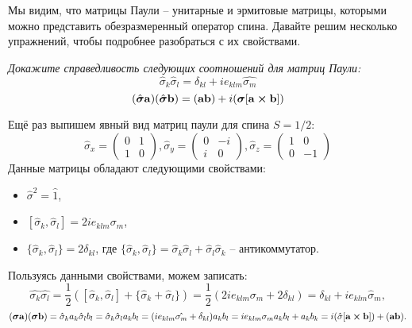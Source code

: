 Мы видим, что матрицы Паули -- унитарные и эрмитовые матрицы, которыми можно представить обезразмеренный оператор спина. Давайте решим несколько упражнений, чтобы подробнее разобраться с их свойствами.
\begin{center}
    \textit{Докажите справедливость следующих соотношений для матриц Паули:}
    \[
    \hat{\sigma}_k\hat{\sigma}_l = \delta_{kl} + ie_{klm}\hat{\sigma_m}
    \]
    \[
    (\hat{\boldsymbol{\sigma}}\mathbf{a})(\hat{\boldsymbol{\sigma}}\mathbf{b}) = (\mathbf{ab}) + i(\boldsymbol{\sigma}[\mathbf{a} \cross \mathbf{b}])
    \]
\end{center}
Ещё раз выпишем явный вид матриц паули для спина $S=1/2$:
\[
    \hat{\sigma}_x = \left(\begin{array}{cc}
        0 & 1 \\
        1 & 0
    \end{array}
    \right), 
    \hat{\sigma}_y = \left(\begin{array}{cc}
        0 & -i \\
        i & 0
    \end{array}
    \right),
    \hat{\sigma}_z = \left(\begin{array}{cc}
        1 & 0 \\
        0 & -1
    \end{array}
    \right)
\]
Данные матрицы обладают следующими свойствами:
\begin{itemize}
    \item $\hat{\sigma}^2 = \hat{1}$,
    \item $[\hat{\sigma}_k, \hat{\sigma}_l] = 2ie_{klm}\sigma_m$,
    \item $\{\hat{\sigma}_k, \hat{\sigma}_l\} = 2\delta_{kl}$, где $\{\hat{\sigma}_k, \hat{\sigma}_l\} = \hat{\sigma}_k\hat{\sigma}_l + \hat{\sigma}_l\hat{\sigma}_k$ -- антикоммутатор.
\end{itemize}
Пользуясь данными свойствами, можем записать:
\[
\hat{\sigma_k}\hat{\sigma_l} = \frac{1}{2}([\hat{\sigma}_k, \hat{\sigma}_l] + \{\hat{\sigma}_k + \hat{\sigma}_l\}) = \frac{1}{2}(2ie_{klm}\sigma_m + 2\delta_{kl}) = \delta_{kl} + ie_{klm}\hat{\sigma}_m,
\]
\[
(\boldsymbol{\sigma}\mathbf{a})(\boldsymbol{\sigma}\mathbf{b}) = \hat{\sigma}_ka_k\hat{\sigma}_lb_l = \hat{\sigma}_k\hat{\sigma}_la_kb_l = (ie_{klm}\hat{\sigma_m} + \delta_{kl})a_kb_l = ie_{klm}\sigma_ma_kb_l + a_kb_k = i(\hat{\sigma}[\mathbf{a}\cross\mathbf{b}]) + (\mathbf{a}\mathbf{b}).
\]


